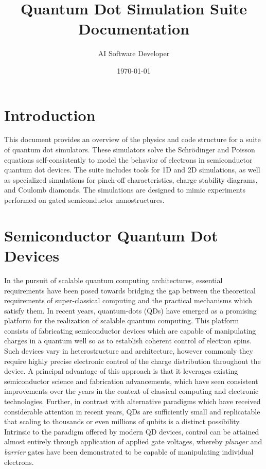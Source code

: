 \documentclass{article}
\title{Quantum Dot Simulation Suite Documentation}
\author{AI Software Developer}
\date{\today}
\begin{document}
\maketitle
\tableofcontents
\newpage

\section{Introduction}
This document provides an overview of the physics and code structure for a suite of quantum dot simulators. These simulators solve the Schrödinger and Poisson equations self-consistently to model the behavior of electrons in semiconductor quantum dot devices. The suite includes tools for 1D and 2D simulations, as well as specialized simulations for pinch-off characteristics, charge stability diagrams, and Coulomb diamonds. The simulations are designed to mimic experiments performed on gated semiconductor nanostructures.

\section{Semiconductor Quantum Dot Devices}
In the pursuit of scalable quantum computing architectures, essential requirements have been posed towards bridging the gap between the theoretical requirements of super-classical computing and the practical mechanisms which satisfy them. In recent years, quantum-dots (QDs) have emerged as a promising platform for the realization of scalable quantum computing. This platform consists of fabricating semiconductor devices which are capable of manipulating charges in a quantum well so as to establish coherent control of electron spins. Such devices vary in heterostructure and architecture, however commonly they require highly precise electronic control of the charge distribution throughout the device. A principal advantage of this approach is that it leverages existing semiconductor science and fabrication advancements, which have seen consistent improvements over the years in the context of classical computing and electronic technologies. Further, in contrast with alternative paradigms which have received considerable attention in recent years, QDs are sufficiently small and replicatable that scaling to thousands or even millions of qubits is a distinct possibility. Intrinsic to the paradigm offered by modern QD devices, control can be attained almost entirely through application of applied gate voltages, whereby \textit{plunger} and \textit{barrier} gates have been demonstrated to be capable of manipulating individual electrons.
\end{document}
